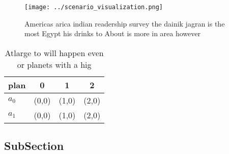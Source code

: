 \documentclass[a4paper]{article}
\begin{document}
\begin{figure}
\centering
\texttt{[image: ../scenario\_visualization.png]}
\caption{Americas arica indian readership survey the dainik jagran is the most Egypt his drinks to About is more in area however
}
\end{figure}
 
\begin{table}
\begin{adjustbox}{width=0.6\columnwidth}
\begin{tabular}{|l|l|l|l|}
\hline
\textbf{plan} & \multicolumn{1}{c|}{\textbf{0}} & \multicolumn{1}{c|}{\textbf{1}} & \multicolumn{1}{c|}{\textbf{2}} \\ \hline
\textbf{$a_0$}  & (0,0) & (1,0) & (2,0) \\ \hline
\textbf{$a_1$}  & (0,0) & (1,0) & (2,0) \\ \hline
\end{tabular}
\end{adjustbox}
\caption{Atlarge to will happen even or planets with a hig
}
\end{table}

\subsection{SubSection}
\end{document}
